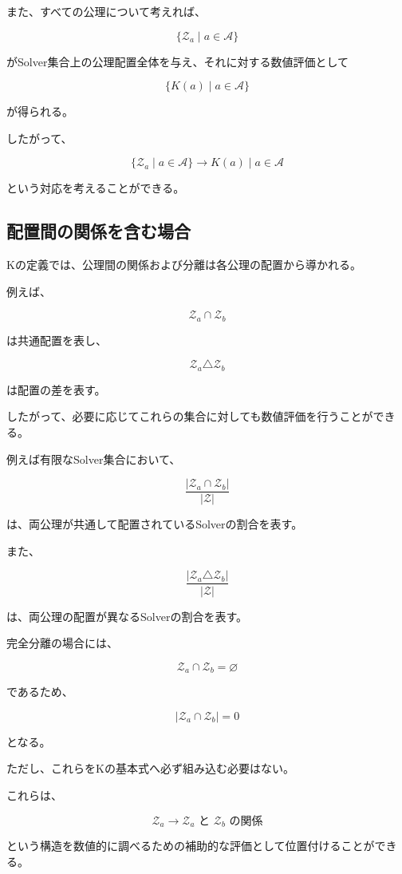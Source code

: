 また、すべての公理について考えれば、

\[
\{\mathcal{Z}_a\mid a\in\mathcal{A}\}
\]

がSolver集合上の公理配置全体を与え、それに対する数値評価として

\[
\{K(a)\mid a\in\mathcal{A}\}
\]

が得られる。

したがって、

\[
\boxed{
\{\mathcal{Z}_a\mid a\in\mathcal{A}\}
\longrightarrow
{K(a)\mid a\in\mathcal{A}}
}
\]

という対応を考えることができる。

\subsection{配置間の関係を含む場合}

Kの定義では、公理間の関係および分離は各公理の配置から導かれる。

例えば、

\[
\mathcal{Z}_a\cap\mathcal{Z}_b
\]

は共通配置を表し、

\[
\mathcal{Z}_a\triangle\mathcal{Z}_b
\]

は配置の差を表す。

したがって、必要に応じてこれらの集合に対しても数値評価を行うことができる。

例えば有限なSolver集合において、

\[
\frac{|\mathcal{Z}_a\cap\mathcal{Z}_b|}{|\mathcal{Z}|}
\]

は、両公理が共通して配置されているSolverの割合を表す。

また、

\[
\frac{|\mathcal{Z}_a\triangle\mathcal{Z}_b|}{|\mathcal{Z}|}
\]

は、両公理の配置が異なるSolverの割合を表す。

完全分離の場合には、

\[
\mathcal{Z}_a\cap\mathcal{Z}_b=\varnothing
\]

であるため、

\[
|\mathcal{Z}_a\cap\mathcal{Z}_b|=0
\]

となる。

ただし、これらをKの基本式へ必ず組み込む必要はない。

これらは、

\[
\mathcal{Z}_a
\longrightarrow
\mathcal{Z}_a\text{ と }\mathcal{Z}_b\text{ の関係}
\]

という構造を数値的に調べるための補助的な評価として位置付けることができる。

